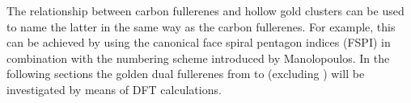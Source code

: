 The relationship between carbon fullerenes and hollow gold clusters can be used
to name the latter in the same way as the carbon fullerenes. For example, this
can be achieved by using the canonical face spiral pentagon indices (FSPI) in
combination with the numbering scheme introduced by
Manolopoulos.\autocite{Fowler-atlas-2006} In the following sections the golden
dual fullerenes from  to  (excluding ) will be
investigated by means of \ac{DFT} calculations.



